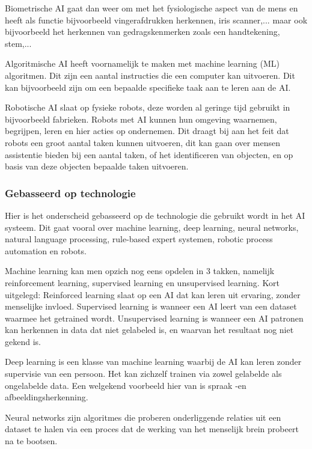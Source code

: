     Biometrische AI gaat dan weer om met het fysiologische aspect van de mens en heeft als functie bijvoorbeeld vingerafdrukken herkennen, iris scanner,... maar ook bijvoorbeeld het herkennen van gedragskenmerken zoals een handtekening, stem,... 
    
    Algoritmische AI heeft voornamelijk te maken met machine learning (ML) algoritmen. Dit zijn een aantal instructies die een computer kan uitvoeren. Dit kan bijvoorbeeld zijn om een bepaalde specifieke taak aan te leren aan de AI.

    Robotische AI slaat op fysieke robots, deze worden al geringe tijd gebruikt in bijvoorbeeld fabrieken. Robots met AI kunnen hun omgeving waarnemen, begrijpen, leren en hier acties op ondernemen. Dit draagt bij aan het feit dat robots een groot aantal taken kunnen uitvoeren, dit kan gaan over mensen assistentie bieden bij een aantal taken, of het identificeren van objecten, en op basis van deze objecten bepaalde taken uitvoeren.

\subsubsection{Gebasseerd op technologie}

    Hier is het onderscheid gebasseerd op de technologie die gebruikt wordt in het AI systeem. Dit gaat vooral over machine learning, deep learning, neural networks, natural language processing, rule-based expert systemen, robotic process automation en robots.
    
    Machine learning kan men opzich nog eens opdelen in 3 takken, namelijk reinforcement learning, supervised learning en unsupervised learning.
    Kort uitgelegd: Reinforced learning slaat op een AI dat kan leren uit ervaring, zonder menselijke invloed. Supervised learning is wanneer een AI leert van een dataset waarmee het getrained wordt. Unsupervised learning is wanneer een AI patronen kan herkennen in data dat niet gelabeled is, en waarvan het resultaat nog niet gekend is.
    
    Deep learning is een klasse van machine learning waarbij de AI kan leren zonder supervisie van een persoon. Het kan zichzelf trainen via zowel gelabelde als ongelabelde data. Een welgekend voorbeeld hier van is spraak -en afbeeldingsherkenning.
    
    Neural networks zijn algoritmes die proberen onderliggende relaties uit een dataset te halen via een proces dat de werking van het menselijk brein probeert na te bootsen.
    
